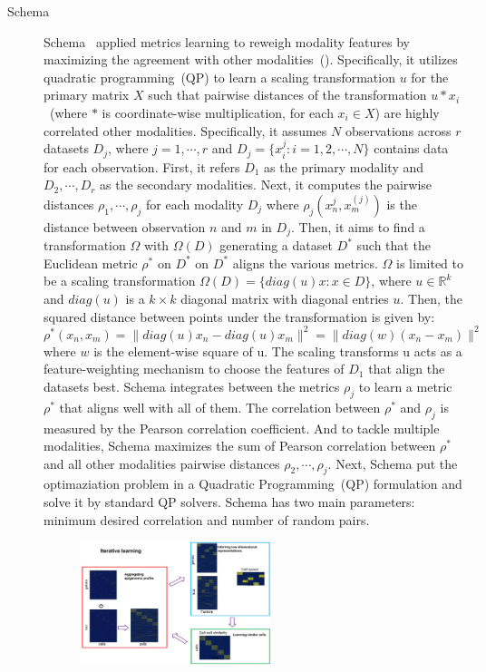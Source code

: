 \begin{description}
  \item[Schema]
  Schema~\citep{singh2021schema} applied metrics learning to reweigh modality features by maximizing the agreement with other modalities~(). Specifically, it utilizes quadratic programming~(QP) to learn a scaling transformation $u$ for the primary matrix $X$ such that pairwise distances of the transformation $u * x_i$~(where $*$ is coordinate-wise multiplication, for each $x_i\in X$) are highly correlated other modalities. Specifically, it assumes $N$ observations across $r$ datasets $D_j$, where $j=1,\cdots,r$ and $D_j = \{x_i^{j}: i = 1,2,\cdots,N\}$ contains data for each observation. First, it refers $D_1$ as the primary modality and $D_2,\cdots,D_r$ as the secondary modalities. Next, it computes the pairwise distances $\rho_1,\cdots,\rho_j$ for each modality $D_j$ where $\rho_j(x_n^{j}, x_m^{(j)})$ is the distance between observation $n$ and $m$ in $D_j$. Then, it aims to find a transformation $\Omega$ with $\Omega(D)$ generating a dataset $D^{*}$ such that the Euclidean metric $\rho^{*}$ on $D^{*}$ on $D^{*}$ aligns the various metrics. $\Omega$ is limited to be a scaling transformation $\Omega(D) = \{diag(u)x: x \in D\}$, where $u \in \mathbb{R}^{k}$ and $diag(u)$ is a $k\times k$ diagonal matrix with diagonal entries $u$. Then, the squared distance between points under the transformation is given by:
  \begin{equation}
  \rho^{*}(x_n, x_m) = \|diag(u)x_n - diag(u)x_m\|^2 = \|diag(w)(x_n - x_m)\|^2
  \end{equation}
  where $w$ is the element-wise square of u. The scaling transforms u acts as a feature-weighting mechanism to choose the features of $D_1$ that align the datasets best. Schema integrates between the metrics $\rho_j$ to learn a metric $\rho^{*}$ that aligns well with all of them. The correlation between $\rho^{*}$ and $\rho_j$ is measured by the Pearson correlation coefficient. And to tackle multiple modalities, Schema maximizes the sum of Pearson correlation between $\rho^{*}$ and all other modalities pairwise distances $\rho_2,\cdots,\rho_j$. Next, Schema put the optimaziation problem in a Quadratic Programming~(QP) formulation and solve it by standard QP solvers. Schema has two main parameters: minimum desired correlation and number of random pairs.
\begin{figure}[!h]
  	\centering
  	\includegraphics[width=0.55\textwidth]{Alg_scAI/fig}

\end{figure}
\end{description}
